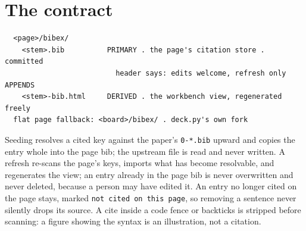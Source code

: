 
\section{The contract}
\begin{verbatim}
  <page>/bibex/
    <stem>.bib          PRIMARY . the page's citation store . committed
                          header says: edits welcome, refresh only APPENDS
    <stem>-bib.html     DERIVED . the workbench view, regenerated freely
  flat page fallback: <board>/bibex/ . deck.py's own fork
\end{verbatim}
Seeding resolves a cited key against the paper's \texttt{0-*.bib} upward and copies the entry whole into the page bib; the upstream file is read and never written. A refresh re-scans the page's keys, imports what has become resolvable, and regenerates the view; an entry already in the page bib is never overwritten and never deleted, because a person may have edited it. An entry no longer cited on the page stays, marked \texttt{not cited on this page}, so removing a sentence never silently drops its source. A cite inside a code fence or backticks is stripped before scanning: a figure showing the syntax is an illustration, not a citation.

